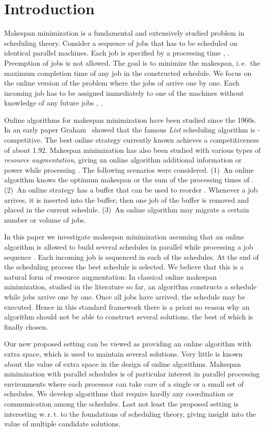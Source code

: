 \documentclass{llncs}
\begin{document}
\section{Introduction}
Makespan minimization is a fundamental and extensively studied problem in scheduling theory. Consider a
sequence of jobs  that has to be scheduled on  identical parallel
machines. Each job  is specified by a processing time , . Preemption of 
jobs is not allowed. The goal is to minimize the makespan, i.\,e.\ the maximum completion time of
any job in the constructed schedule. We focus on the online version of the problem where the jobs
of  arrive one by one. Each incoming job  has to be assigned immediately 
to one of the machines without knowledge of any future jobs , .

Online algorithms for makespan minimization have been studied since the 1960s. In an early paper
Graham~\cite{G} showed that the famous {\em List\/} scheduling algorithm is -competitive.
The best online strategy currently known achieves a competitiveness of about 1.92. Makespan minimization 
has also been studied with various types of {\em resource augmentation\/}, giving an online algorithm  
additional information or power while processing . The following scenarios were considered.
(1)~An online algorithm knows the optimum makespan or the sum of the processing times of .
(2)~An online strategy has a buffer that can be used to reorder . Whenever a job arrives, it
is inserted into the buffer; then one job of the buffer is removed and placed in the current schedule. 
(3)~An online algorithm may migrate a certain number or volume of jobs. 

In this paper we investigate makespan minimization assuming that an online algorithm is allowed to
build several schedules in parallel while processing a job sequence . Each incoming job is
sequenced in each of the schedules. At the end of the scheduling process the best schedule is selected. 
We believe that this is a natural form of resource augmentation: In classical online makespan minimization, 
studied in the literature so far, an algorithm constructs a schedule while jobs arrive one by one. 
Once all jobs have arrived, the schedule may be executed. 
Hence in this standard framework there is a priori no reason why an algorithm should not be 
able to construct several solutions, the best of which is finally chosen. 

Our new proposed setting can be viewed
as providing an online algorithm with extra space, which is used to maintain several 
solutions. Very little is known about the value of 
extra space in the design of online algorithms. Makespan minimization with parallel schedules
is of particular interest in parallel processing environments where each processor can take care of
a single or a small set of schedules. We develop algorithms that require hardly any coordination 
or communication among the schedules. Last not least the proposed setting is interesting
w.\,r.\,t. to the foundations of scheduling theory, giving insight into the value of multiple
candidate solutions.
\end{document}
